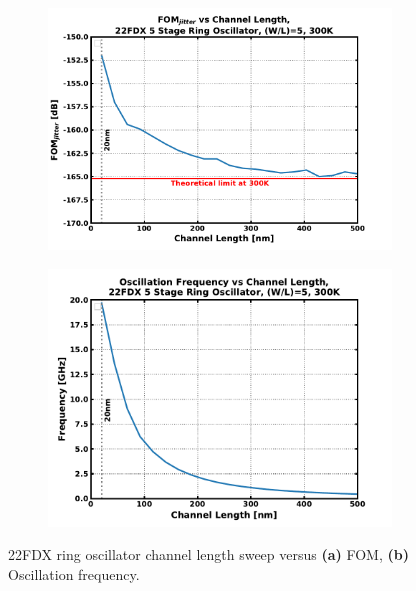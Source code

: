 		\begin{figure}[htb!]
		    \centering
		    \begin{subfigure}{0.5\textwidth}
		        \centering
		        \includegraphics[width=1\textwidth, angle=0]{./figs/design/22fdx_rosc_fom}
		        \caption{ }
		        \label{fig:rosc_fom}
		    \end{subfigure}%
		    \begin{subfigure}{0.5\textwidth}
		        \centering
		        \includegraphics[width=1\textwidth, angle=0]{./figs/design/22fdx_rosc_freq}
		        \caption{ }
		        \label{fig:rosc_freq}
		    \end{subfigure}
		    \label{fig:rosc_groupa}
		    \caption{22FDX ring oscillator channel length sweep versus \textbf{(a)} FOM, \textbf{(b)} Oscillation frequency.}
		\end{figure} 	

